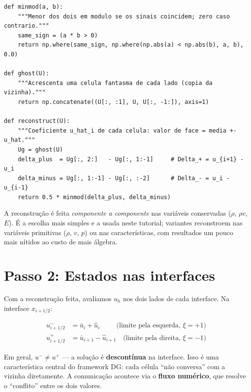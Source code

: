 \documentclass[10pt,a4paper]{article}
\newcommand{\ub}{\bar u}
\newcommand{\uh}{\hat u}
\begin{document}
\begin{lstlisting}[caption={Reconstrução minmod (Python). As células fantasma copiam o valor da vizinha (contorno transmissivo); U tem uma linha por variável conservada e uma coluna por célula.},label=lst:minmod]
def minmod(a, b):
    """Menor dos dois em modulo se os sinais coincidem; zero caso contrario."""
    same_sign = (a * b > 0)
    return np.where(same_sign, np.where(np.abs(a) < np.abs(b), a, b), 0.0)

def ghost(U):
    """Acrescenta uma celula fantasma de cada lado (copia da vizinha)."""
    return np.concatenate((U[:, :1], U, U[:, -1:]), axis=1)

def reconstruct(U):
    """Coeficiente u_hat_i de cada celula: valor de face = media +- u_hat."""
    Ug = ghost(U)
    delta_plus  = Ug[:, 2:]   - Ug[:, 1:-1]     # Delta_+ = u_{i+1} - u_i
    delta_minus = Ug[:, 1:-1] - Ug[:, :-2]      # Delta_- = u_i - u_{i-1}
    return 0.5 * minmod(delta_plus, delta_minus)
\end{lstlisting}

A reconstrução é feita \emph{componente a componente} nas variáveis conservadas ($\rho$, $\rho v$, $E$). É a escolha mais simples e a usada neste tutorial; variantes reconstroem nas variáveis primitivas ($\rho$, $v$, $p$) ou nas características, com resultados um pouco mais nítidos ao custo de mais álgebra.

\section{Passo 2: Estados nas interfaces}

Com a reconstrução feita, avaliamos $u_h$ nos dois lados de cada interface. Na interface $x_{i+1/2}$:
\begin{destaque}
\begin{align}
u^-_{i+1/2}&=\ub_i+\uh_i\qquad\ \ \text{(limite pela esquerda, }\xi=+1)\label{eq:um}\\
u^+_{i+1/2}&=\ub_{i+1}-\uh_{i+1}\quad\text{(limite pela direita, }\xi=-1)\label{eq:up}
\end{align}
\end{destaque}

Em geral, $u^-\neq u^+$ --- a solução é \textbf{descontínua} na interface. Isso é uma característica central do framework DG: cada célula ``não conversa'' com a vizinha diretamente. A comunicação acontece via o \textbf{fluxo numérico}, que resolve o ``conflito'' entre os dois valores.
\end{document}
